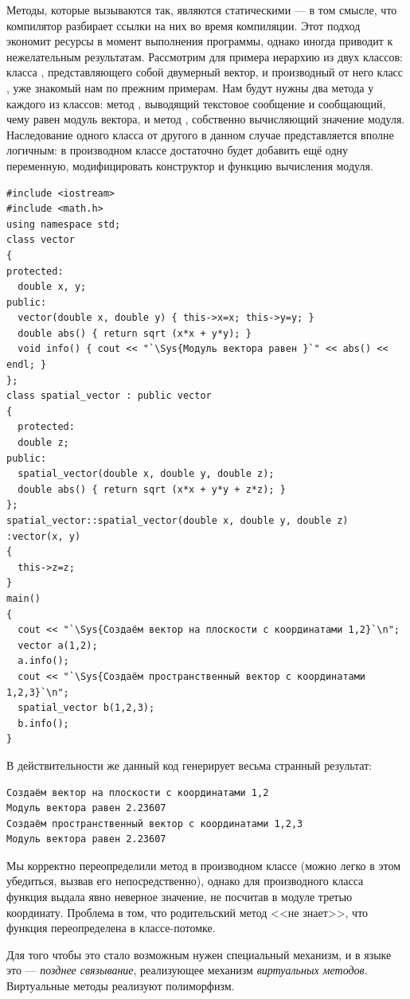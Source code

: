 Методы, которые вызываются так, являются статическими --- в том смысле, что компилятор разбирает ссылки на них во время
компиляции. Этот подход экономит ресурсы в момент выполнения программы, однако иногда приводит к нежелательным
результатам. Рассмотрим для примера иерархию из двух классов: класса , представляющего
собой двумерный вектор, и производный от него класс , уже знакомый нам по прежним
примерам. Нам будут нужны два метода у каждого из классов: метод , выводящий текстовое
сообщение и сообщающий, чему равен модуль вектора, и метод , собственно вычисляющий значение
модуля. Наследование одного класса от другого в данном случае представляется вполне логичным: в производном классе
достаточно будет добавить ещё одну переменную, модифицировать конструктор и функцию вычисления модуля.
\begin{lstlisting}
#include <iostream>
#include <math.h>
using namespace std;
class vector 
{
protected:
  double x, y;
public:
  vector(double x, double y) { this->x=x; this->y=y; }
  double abs() { return sqrt (x*x + y*y); }
  void info() { cout << "`\Sys{Модуль вектора равен }`" << abs() << endl; }
};
class spatial_vector : public vector 
{
  protected:
  double z;
public:
  spatial_vector(double x, double y, double z);
  double abs() { return sqrt (x*x + y*y + z*z); }
};
spatial_vector::spatial_vector(double x, double y, double z) :vector(x, y) 
{
  this->z=z;
}
main() 
{
  cout << "`\Sys{Создаём вектор на плоскости с координатами 1,2}`\n";
  vector a(1,2);
  a.info();
  cout << "`\Sys{Создаём пространственный вектор с координатами 1,2,3}`\n";
  spatial_vector b(1,2,3);
  b.info();
}
\end{lstlisting}

В действительности же данный код генерирует весьма странный результат:
\begin{verbatim}
Создаём вектор на плоскости с координатами 1,2 
Модуль вектора равен 2.23607 
Создаём пространственный вектор с координатами 1,2,3 
Модуль вектора равен 2.23607
\end{verbatim}
Мы корректно переопределили метод  в производном классе (можно легко в этом убедиться, вызвав
его непосредственно), однако для производного класса функция  выдала явно неверное
значение, не посчитав в модуле третью координату. Проблема в том, что родительский метод 
<<не знает>>, что функция  переопределена в классе-потомке.

Для того чтобы это стало возможным нужен специальный механизм, и в языке  это --- \emph{позднее связывание}, реализующее механизм \emph{виртуальных
методов}. Виртуальные методы реализуют полиморфизм.

